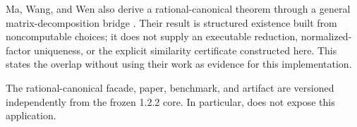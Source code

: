 Ma, Wang, and Wen also derive a rational-canonical theorem through a general
matrix-decomposition bridge \citep[Sections 5.1 and 6.2]{maWangWen2026}.  Their
result is structured existence built from noncomputable choices; it does not
supply an executable reduction, normalized-factor uniqueness, or the explicit
similarity certificate constructed here.  This states the overlap without
using their work as evidence for this implementation.

The rational-canonical facade, paper, benchmark, and artifact are versioned
independently from the frozen 1.2.2 core.  In particular,
 does not expose this application.
